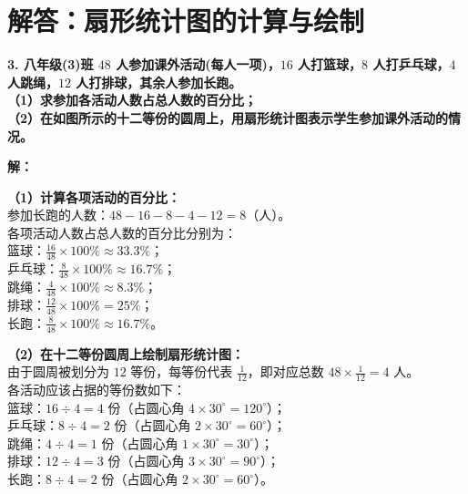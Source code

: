 \newpage



\newpage

\section{解答：扇形统计图的计算与绘制}

\vspace{0.6cm}

\textbf{3. 八年级(3)班 $48$ 人参加课外活动(每人一项)，$16$ 人打篮球，$8$ 人打乒乓球，$4$ 人跳绳，$12$ 人打排球，其余人参加长跑。}\\
\textbf{（1）求参加各活动人数占总人数的百分比；}\\
\textbf{（2）在如图所示的十二等份的圆周上，用扇形统计图表示学生参加课外活动的情况。}

\vspace{0.4cm}

\textbf{解：}

\textbf{（1）计算各项活动的百分比：} \\
参加长跑的人数：$48 - 16 - 8 - 4 - 12 = 8$（人）。\\
各项活动人数占总人数的百分比分别为：\\
篮球：$\frac{16}{48} \times 100\% \approx 33.3\%$；\\
乒乓球：$\frac{8}{48} \times 100\% \approx 16.7\%$；\\
跳绳：$\frac{4}{48} \times 100\% \approx 8.3\%$；\\
排球：$\frac{12}{48} \times 100\% = 25\%$；\\
长跑：$\frac{8}{48} \times 100\% \approx 16.7\%$。

\vspace{0.4cm}

\textbf{（2）在十二等份圆周上绘制扇形统计图：} \\
由于圆周被划分为 $12$ 等份，每等份代表 $\frac{1}{12}$，即对应总数 $48 \times \frac{1}{12} = 4$ 人。\\
各活动应该占据的等份数如下：\\
篮球：$16 \div 4 = 4$ 份（占圆心角 $4 \times 30^\circ = 120^\circ$）；\\
乒乓球：$8 \div 4 = 2$ 份（占圆心角 $2 \times 30^\circ = 60^\circ$）；\\
跳绳：$4 \div 4 = 1$ 份（占圆心角 $1 \times 30^\circ = 30^\circ$）；\\
排球：$12 \div 4 = 3$ 份（占圆心角 $3 \times 30^\circ = 90^\circ$）；\\
长跑：$8 \div 4 = 2$ 份（占圆心角 $2 \times 30^\circ = 60^\circ$）。

